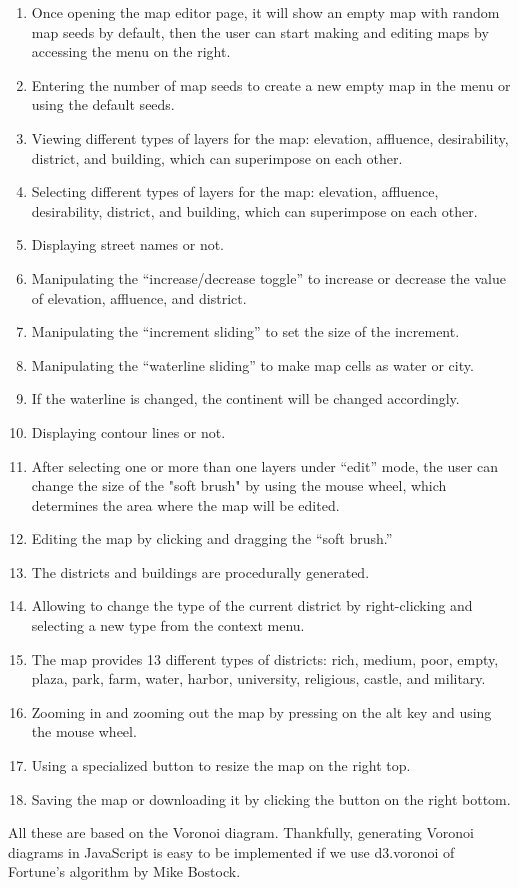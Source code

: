 \begin{enumerate}
  \item Once opening the map editor page, it will show an empty map with random map seeds by default, then the user can start making and editing maps by accessing the menu on the right.
  \item Entering the number of map seeds to create a new empty map in the menu or using the default seeds.
  \item Viewing different types of layers for the map: elevation, affluence, desirability, district, and building, which can superimpose on each other.
  \item Selecting different types of layers for the map: elevation, affluence, desirability, district, and building, which can superimpose on each other.
  \item Displaying street names or not.
  \item Manipulating the ``increase/decrease toggle'' to increase or decrease the value of elevation, affluence, and district.
  \item Manipulating the ``increment sliding'' to set the size of the increment.
  \item Manipulating the ``waterline sliding'' to make map cells as water or city.
  \item If the waterline is changed, the continent will be changed accordingly.
  \item Displaying contour lines or not.
  \item After selecting one or more than one layers under ``edit'' mode, the user can change the size of the "soft brush" by using the mouse wheel, which determines the area where the map will be edited.
  \item Editing the map by clicking and dragging the ``soft brush.''
  \item The districts and buildings are procedurally generated.
  \item Allowing to change the type of the current district by right-clicking and selecting a new type from the context menu.
  \item The map provides 13 different types of districts: rich, medium, poor, empty, plaza, park, farm, water, harbor, university, religious, castle, and military.
  \item Zooming in and zooming out the map by pressing on the alt key and using the mouse wheel.
  \item Using a specialized button to resize the map on the right top.
  \item Saving the map or downloading it by clicking the button on the right bottom.
\end{enumerate}

All these are based on the Voronoi diagram. Thankfully, generating Voronoi diagrams in JavaScript is easy to be implemented if we use d3.voronoi of Fortune’s algorithm by Mike Bostock.
